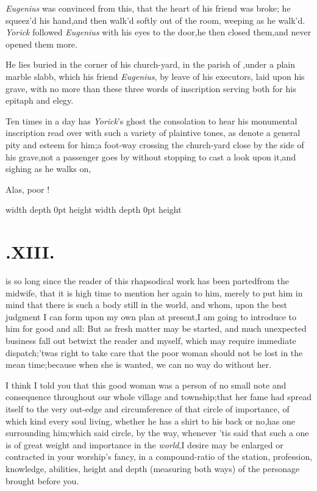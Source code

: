 \documentclass{article}
\begin{document}
\textit{Eugenius} was convinced from this,\break
that the heart of his friend was broke;\break
he squeez’d his hand,\tsh  and then\break
walk’d softly out of the room, weeping as he walk’d. \textit{Yorick}
followed \textit{Eugenius} with his eyes to the door,\tsk  he then
closed them,\tsk and never opened them more.

He lies buried in the corner of his church-yard, in the parish of
\tsh,\break under a plain marble slabb, which his friend
\textit{Eugenius}, by leave of his executors, laid upon his grave, with no more
than these three words of inscription serving both for his epitaph and
elegy.

\vfill
\centerline{}
\vfill

Ten times in a day has \textit{Yorick}’s ghost the consolation to hear his
monumental inscription read over with such a variety of plaintive tones, as
denote a general
pity and esteem for him;\tsh  a foot-way crossing the
church-yard close by the side of his grave,\tsk  not a passenger goes by
without stopping to cast a look upon it,\tsh  and sighing as he walks on,

\bigskip
\bigskip
\centerline{Alas, poor !}
\vfill
{}
\newpage \noindent \vrule width \hsize depth 0pt height \vsize
\newpage \noindent \vrule width \hsize depth 0pt height \vsize
\newpage

\null
\section{.\enspace XIII.}

 is so long since the reader of
this rhapsodical work has been parted\break from the midwife, that it is
high time to mention her again to him, merely to put him in mind
that there is such a body still in the world, and whom, upon the
best judgment I can form upon my own plan at present,\tsk I am going to
introduce to him for good and all: But as fresh matter may be
started, and much unexpected business fall out betwixt the reader
and myself, which may require immediate
dispatch;\tsh  ’twas right to take care that the poor
woman should not be lost in the mean time;\tsk  because when she
is wanted, we can no way do without her.

I think I told you that this good wo\-man was a person of no small
note and consequence throughout our whole village and
township;\tsk  that her fame had spread itself to the very
out-edge and circumference of that circle of importance, of which
kind every soul living, whether he has a shirt to his back or no,\tsh  has
one surrounding him;\tsk  which said circle, by the way, whenever
’tis said that such a one is of great weight and importance
in the \textit{world},\tsh  I desire may be enlarged or
contracted in your worship’s fancy, in a compound-ratio of
the station, profession, knowledge, abilities, height and depth
(measuring both ways) of the personage brought before you.
\end{document}
